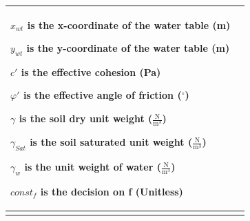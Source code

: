 \documentclass[12pt]{article}
\begin{document}
\begin{minipage}{\textwidth}
\begin{tabular}{p{} p{}}
\begin{symbDescription}
                                                                                           \item{${x_{wt}}$ is the x-coordinate of the water table (m)}
                                                                                           \item{${y_{wt}}$ is the y-coordinate of the water table (m)}
                                                                                           \item{$c'$ is the effective cohesion (Pa)}
                                                                                           \item{$φ'$ is the effective angle of friction (${}^{\circ}$)}
                                                                                           \item{$γ$ is the soil dry unit weight ($\frac{\text{N}}{\text{m}^{3}}$)}
                                                                                           \item{${γ_{Sat}}$ is the soil saturated unit weight ($\frac{\text{N}}{\text{m}^{3}}$)}
                                                                                           \item{${γ_{w}}$ is the unit weight of water ($\frac{\text{N}}{\text{m}^{3}}$)}
                                                                                           \item{$const_f$ is the decision on f (Unitless)}
                                                                                           \end{symbDescription}
                                                                                           \\ \midrule \\

\end{tabular}
\end{minipage}
\end{document}
